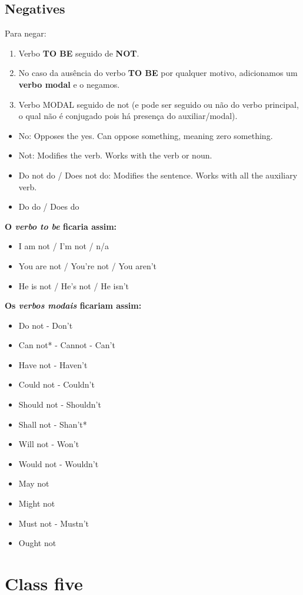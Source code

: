 \documentclass[12pt,a4paper]{article} %
\begin{document}
\subsection{Negatives}
Para negar:
\begin{enumerate}
\item Verbo \textbf{TO BE} seguido de \textbf{NOT}.
\item No caso da ausência do verbo \textbf{TO BE} por qualquer motivo, adicionamos um \textbf{verbo modal} e o negamos.
\item Verbo MODAL seguido de not (e pode ser seguido ou não do verbo principal, o qual não é conjugado pois há presença do auxiliar/modal).
\end{enumerate}
\begin{itemize}
\item No: Opposes the yes. Can oppose something, meaning zero something.
\item Not: Modifies the verb. Works with the verb or noun.
\item Do not do / Does not do: Modifies the sentence. Works with all the auxiliary verb.
\item Do do / Does do
\end{itemize}
\textbf{O \textit{verbo to be} ficaria assim:}
\begin{itemize}
\item I am not / I'm not / n/a
\item You are not / You're not / You aren't
\item He is not / He's not / He isn't
\end{itemize}
\textbf{Os \textit{verbos modais} ficariam assim:}
\begin{itemize}
\item Do not - Don't
\item Can not* - Cannot - Can't
\item Have not - Haven't
\item Could not - Couldn't
\item Should not - Shouldn't
\item Shall not - Shan't*
\item Will not - Won't
\item Would not - Wouldn't
\item May not
\item Might not
\item Must not - Mustn't
\item Ought not
\end{itemize}
\section{Class five}
\end{document}
